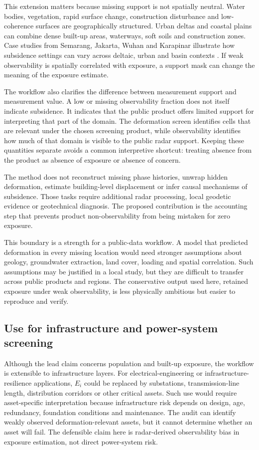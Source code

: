 \documentclass[pdflatex,sn-mathphys-ay]{sn-jnl}
\begin{document}
This extension matters because missing support is not spatially neutral. Water bodies, vegetation, rapid surface change, construction disturbance and low-coherence surfaces are geographically structured. Urban deltas and coastal plains can combine dense built-up areas, waterways, soft soils and construction zones. Case studies from Semarang, Jakarta, Wuhan and Karapinar illustrate how subsidence settings can vary across deltaic, urban and basin contexts \citep{marfai2007semarang,hakim2020jakarta,zhang2019wuhan,orhan2021karapinar}. If weak observability is spatially correlated with exposure, a support mask can change the meaning of the exposure estimate.

The workflow also clarifies the difference between measurement support and measurement value. A low or missing observability fraction does not itself indicate subsidence. It indicates that the public product offers limited support for interpreting that part of the domain. The deformation screen identifies cells that are relevant under the chosen screening product, while observability identifies how much of that domain is visible to the public radar support. Keeping these quantities separate avoids a common interpretive shortcut: treating absence from the product as absence of exposure or absence of concern.

The method does not reconstruct missing phase histories, unwrap hidden deformation, estimate building-level displacement or infer causal mechanisms of subsidence. Those tasks require additional radar processing, local geodetic evidence or geotechnical diagnosis. The proposed contribution is the accounting step that prevents product non-observability from being mistaken for zero exposure.

This boundary is a strength for a public-data workflow. A model that predicted deformation in every missing location would need stronger assumptions about geology, groundwater extraction, land cover, loading and spatial correlation. Such assumptions may be justified in a local study, but they are difficult to transfer across public products and regions. The conservative output used here, retained exposure under weak observability, is less physically ambitious but easier to reproduce and verify.

\subsection{Use for infrastructure and power-system screening}

Although the lead claim concerns population and built-up exposure, the workflow is extensible to infrastructure layers. For electrical-engineering or infrastructure-resilience applications, $E_i$ could be replaced by substations, transmission-line length, distribution corridors or other critical assets. Such use would require asset-specific interpretation because infrastructure risk depends on design, age, redundancy, foundation conditions and maintenance. The audit can identify weakly observed deformation-relevant assets, but it cannot determine whether an asset will fail. The defensible claim here is radar-derived observability bias in exposure estimation, not direct power-system risk.
\end{document}
